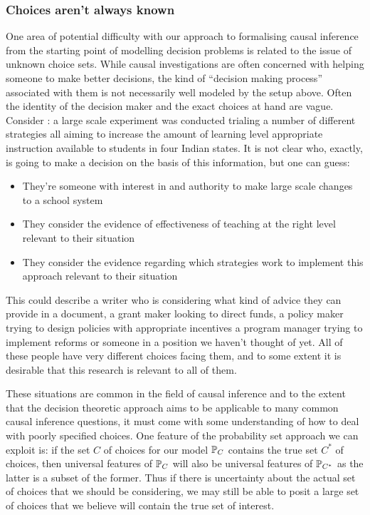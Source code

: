 \subsubsection{Choices aren't always known}

One area of potential difficulty with our approach to formalising causal inference from the starting point of modelling decision problems is related to the issue of unknown choice sets. While causal investigations are often concerned with helping someone to make better decisions, the kind of ``decision making process'' associated with them is not necessarily well modeled by the setup above. Often the identity of the decision maker and the exact choices at hand are vague. Consider \citet{banerjee_mainstreaming_2016}: a large scale experiment was conducted trialing a number of different strategies all aiming to increase the amount of learning level appropriate instruction available to students in four Indian states. It is not clear who, exactly, is going to make a decision on the basis of this information, but one can guess:

\begin{itemize}
    \item They're someone with interest in and authority to make large scale changes to a school system
    \item They consider the evidence of effectiveness of teaching at the right level relevant to their situation
    \item They consider the evidence regarding which strategies work to implement this approach relevant to their situation
\end{itemize}

This could describe a writer who is considering what kind of advice they can provide in a document, a grant maker looking to direct funds, a policy maker trying to design policies with appropriate incentives a program manager trying to implement reforms or someone in a position we haven't thought of yet. All of these people have very different choices facing them, and to some extent it is desirable that this research is relevant to all of them.

These situations are common in the field of causal inference and to the extent that the decision theoretic approach aims to be applicable to many common causal inference questions, it must come with some understanding of how to deal with poorly specified choices. One feature of the probability set approach we can exploit is: if the set $C$ of choices for our model $\mathbb{P}_C$ contains the true set $C^*$ of choices, then universal features of $\mathbb{P}_C$ will also be universal features of $\mathbb{P}_{C^*}$ as the latter is a subset of the former. Thus if there is uncertainty about the actual set of choices that we should be considering, we may still be able to posit a large set of choices that we believe will contain the true set of interest.